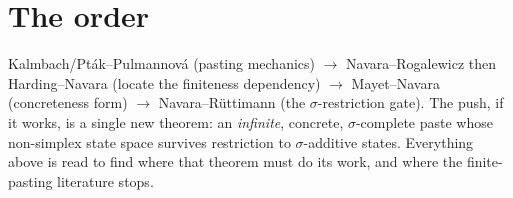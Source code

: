 \documentclass[11pt]{article}
\begin{document}
\section*{The order}

\noindent Kalmbach/Pt\'ak--Pulmannov\'a (pasting mechanics) $\to$
Navara--Rogalewicz then Harding--Navara (locate the finiteness dependency) $\to$
Mayet--Navara (concreteness form) $\to$ Navara--R\"uttimann (the $\sigma$-restriction
gate). The push, if it works, is a single new theorem: an \emph{infinite}, concrete,
$\sigma$-complete paste whose non-simplex state space survives restriction to
$\sigma$-additive states. Everything above is read to find where that theorem must do
its work, and where the finite-pasting literature stops.



\end{document}
